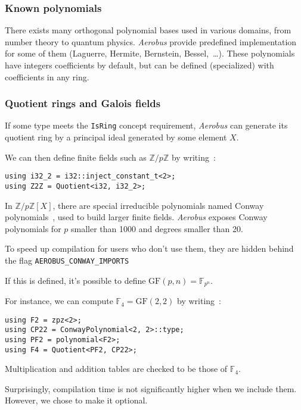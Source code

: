 \documentclass[twocolumn, switch]{article}
\begin{document}
\subsubsection{Known polynomials}

There exists many orthogonal polynomial bases used in various domains, from number theory to quantum physics.
\textit{Aerobus} provide predefined implementation for some of them (Laguerre, Hermite, Bernstein, Bessel,~\ldots). These polynomials have integers coefficients by default, but can be defined (specialized) with coefficients in any ring.

\subsubsection{Quotient rings and Galois fields}

If some type meets the \lstinline{IsRing} concept requirement, \textit{Aerobus} can generate its quotient ring by a principal ideal generated by some element $X$.

We can then define finite fields such as $\mathbb{Z}/p\mathbb{Z}$ by writing~:

\begin{lstlisting}
using i32_2 = i32::inject_constant_t<2>;
using Z2Z = Quotient<i32, i32_2>;
\end{lstlisting}

In $\mathbb{Z}/p\mathbb{Z}[X]$, there are special irreducible polynomials named Conway polynomials~\cite{holt2005handbook}, used to build larger finite fields. \textit{Aerobus} exposes Conway polynomials for $p$ smaller than 1000 and degrees smaller than 20.

To speed up compilation for users who don't use them, they are hidden behind the flag \lstinline{AEROBUS_CONWAY_IMPORTS}

If this is defined, it's possible to define $\mathrm{GF}(p, n) = \mathbb{F}_{p^n}$.

For instance, we can compute $\mathbb{F}_4 = \mathrm{GF}(2, 2)$ by writing~:

\begin{lstlisting}
using F2 = zpz<2>;
using CP22 = ConwayPolynomial<2, 2>::type;
using PF2 = polynomial<F2>;
using F4 = Quotient<PF2, CP22>;
\end{lstlisting}

Multiplication and addition tables are checked to be those of $\mathbb{F}_4$.

Surprisingly, compilation time is not significantly higher when we include them. However, we chose to make it optional.
\end{document}
